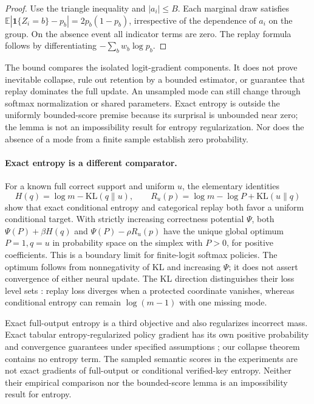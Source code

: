 \documentclass{article}
\newcommand{\1}{\mathbf 1}
\newcommand{\E}{\mathbb E}
\theoremstyle{remark}
\theoremstyle{definition}
\theoremstyle{plain}
\begin{document}
\begin{proof}
Use the triangle inequality and $|a_i|\le B$. Each marginal draw satisfies
$\E|\1\{Z_i=b\}-p_b|=2p_b(1-p_b)$, irrespective of the dependence of
$a_i$ on the group. On the absence event all indicator terms are zero.
The replay formula follows by differentiating $-\sum_b w_b\log p_b$.
\end{proof}

The bound compares the isolated logit-gradient components. It does not prove
inevitable collapse, rule out retention by a bounded estimator, or guarantee
that replay dominates the full update. An unsampled mode can still change
through softmax normalization or shared parameters. Exact entropy is outside
the uniformly bounded-score premise because its surprisal is unbounded near
zero; the lemma is not an impossibility result for entropy regularization.
Nor does the absence of a mode from a finite sample establish zero probability.

\paragraph{Exact entropy is a different comparator.}
For a known full correct support and uniform $u$, the elementary identities
\[
 H(q)=\log m-\mathrm{KL}(q\|u),\qquad
 R_u(p)=\log m-\log P+\mathrm{KL}(u\|q)
\]
show that exact conditional entropy and categorical replay both favor a
uniform conditional target. With strictly increasing correctness potential
$\Psi$, both $\Psi(P)+\beta H(q)$ and $\Psi(P)-\rho R_u(p)$ have the unique
global optimum $P=1,q=u$ in probability space on the simplex with $P>0$,
for positive coefficients. This is a boundary limit for finite-logit softmax
policies. The optimum follows from nonnegativity of KL and increasing
$\Psi$; it does not assert convergence of either neural update. The KL direction distinguishes their
loss level sets \citep{pereyra2017confidencepenalty,agarwal2021policygradient}:
replay loss diverges when a protected coordinate vanishes, whereas
conditional entropy can remain $\log(m-1)$ with one missing mode.

Exact full-output entropy is a third objective and also regularizes incorrect
mass. Exact tabular entropy-regularized policy gradient has its own positive
probability and convergence guarantees under specified assumptions
\citep{mei2020softmaxpg}; our collapse theorem contains no entropy term.
The sampled semantic scores in the experiments are not exact gradients of
full-output or conditional verified-key entropy. Neither their empirical
comparison nor the bounded-score lemma is an impossibility result for entropy.
\end{document}
